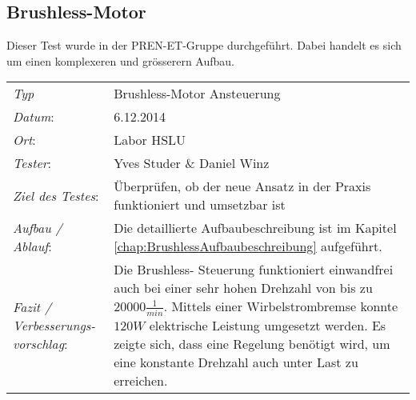 \subsection{Brushless-Motor}
	Dieser Test wurde in der PREN-ET-Gruppe durchgeführt. Dabei handelt es sich um 
	einen komplexeren und grösserern Aufbau.\\

\begin{tabular}{p{3.6cm}p{\textwidth-3.6cm-0.7cm}}
\rule{0pt}{11pt}\textit{Typ}              & Brushless-Motor Ansteuerung \\ 
\rule{0pt}{11pt}\textit{Datum}:           & 6.12.2014   \\
\rule{0pt}{11pt}\textit{Ort}:             & Labor HSLU \\
\rule{0pt}{11pt}\textit{Tester}:          & Yves Studer \& Daniel Winz \\
\rule{0pt}{11pt}\textit{Ziel des Testes}: & Überprüfen, ob der neue Ansatz in der 
Praxis funktioniert und umsetzbar ist\\
\rule{0pt}{11pt}\textit{Aufbau / Ablauf}: & Die detaillierte Aufbaubeschreibung ist 
im Kapitel \ref{chap:BrushlessAufbaubeschreibung} aufgeführt.\\
\rule{0pt}{11pt}\textit{Fazit / Verbesserungs-\newline vorschlag}: & Die Brushless-
Steuerung funktioniert einwandfrei auch bei einer sehr hohen Drehzahl von bis zu 
$20000\frac{1}{min}$. Mittels einer Wirbelstrombremse konnte $120 W$ elektrische 
Leistung umgesetzt werden. Es zeigte sich, dass eine Regelung benötigt wird, um 
eine konstante Drehzahl auch unter Last zu erreichen.
\end{tabular}
    